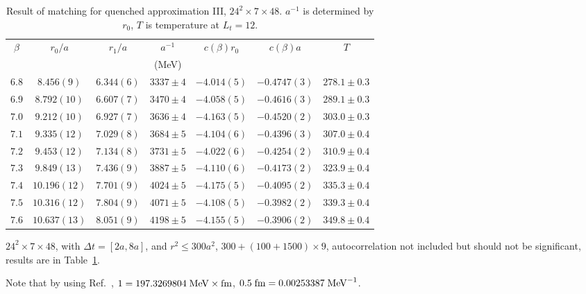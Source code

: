 \begin{table}
\begin{center}
\begin{tabular}{c|c|c|c|c|c|c}
    \hline    
$\beta$ & $r_0/a$ & $r_1/a$ & $a^{-1}$ & $c(\beta)r_0$ & $c(\beta)a$ & $T$\\
& & & (MeV) & & \\
\hline
$6.8$ & $8.456(9)$   & $6.344(6)$  & $3337\pm 4$ & $-4.014(5)$ & $-0.4747(3)$ & $278.1\pm 0.3$\\
\hline
$6.9$ & $8.792(10)$  & $6.607(7)$  & $3470\pm 4$ & $-4.058(5)$ & $-0.4616(3)$ & $289.1\pm 0.3$\\
\hline
$7.0$ & $9.212(10)$  & $6.927(7)$  & $3636\pm 4$ & $-4.163(5)$ & $-0.4520(2)$ & $303.0\pm 0.3$\\
\hline
$7.1$ & $9.335(12)$  & $7.029(8)$  & $3684\pm 5$ & $-4.104(6)$ & $-0.4396(3)$ & $307.0\pm 0.4$\\ 
\hline
$7.2$ & $9.453(12)$  & $7.134(8)$  & $3731\pm 5$ & $-4.022(6)$ & $-0.4254(2)$ & $310.9\pm 0.4$\\
\hline
$7.3$ & $9.849(13)$  & $7.436(9)$  & $3887\pm 5$ & $-4.110(6)$ & $-0.4173(2)$ & $323.9\pm 0.4$\\
\hline
$7.4$ & $10.196(12)$ & $7.701(9)$  & $4024\pm 5$ & $-4.175(5)$ & $-0.4095(2)$ & $335.3\pm 0.4$\\
\hline
$7.5$ & $10.316(12)$ & $7.804(9)$  & $4071\pm 5$ & $-4.108(5)$ & $-0.3982(2)$ & $339.3\pm 0.4$\\
\hline
$7.6$ & $10.637(13)$ & $8.051(9)$  & $4198\pm 5$ & $-4.155(5)$ & $-0.3906(2)$ & $349.8\pm 0.4$\\
\hline
\end{tabular}
\end{center}
\caption{\label{tab.res.matchingquench3}Result of matching for quenched approximation III, $24^2\times 7 \times 48$. $a^{-1}$ is determined by $r_0$, $T$ is temperature at $L_t=12$.}
\end{table}
$24^2\times 7 \times 48$, with $\Delta t = [2a, 8a]$, and $r^2\leq 300 a^2$, $300+(100+1500)\times 9$, autocorrelation not included but should not be significant, results are in Table~\ref{tab.res.matchingquench3}.

Note that by using Ref.~\cite{PDG}, $1=197.3269804 \;{\rm MeV} \times {\rm fm}$, $0.5\;{\rm fm}=0.00253387\;{\rm MeV}^{-1}$.

